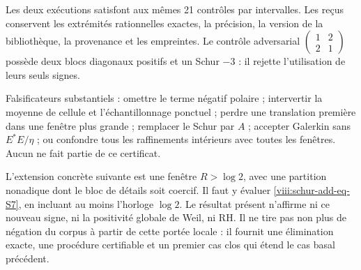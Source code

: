 
Les deux exécutions satisfont aux mêmes 21 contrôles par intervalles.
Les reçus conservent les extrémités rationnelles exactes, la précision, la version
de la bibliothèque, la provenance et les empreintes. Le contrôle adversarial
\(\begin{pmatrix}1&2\\2&1\end{pmatrix}\) possède deux blocs
diagonaux positifs et un Schur \(-3\) : il rejette l'utilisation de leurs seuls signes.

Falsificateurs substantiels : omettre le terme négatif polaire ; intervertir la moyenne
de cellule et l'échantillonnage ponctuel ; perdre une translation première dans une
fenêtre plus grande ; remplacer le Schur par \(A\) ; accepter Galerkin sans
\(E^*E/\eta\) ; ou confondre tous les raffinements intérieurs avec
toutes les fenêtres. Aucun ne fait partie de ce certificat.

L'extension concrète suivante est une fenêtre \(R>\log2\), avec
une partition nonadique dont le bloc de détails soit coercif. Il faut y
évaluer \eqref{viii:schur-add-eq-S7}, en incluant au moins l'horloge \(\log2\).
Le résultat présent n'affirme ni ce nouveau signe, ni la positivité
globale de Weil, ni RH. Il ne tire pas non plus de négation du corpus à partir
de cette portée locale : il fournit une élimination exacte, une procédure
certifiable et un premier cas clos qui étend le cas basal précédent.

